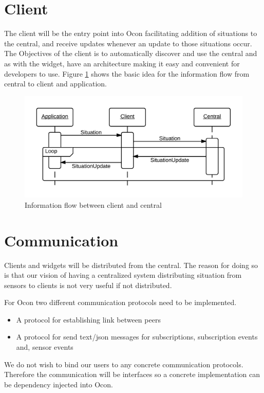 \documentclass[../report.tex]{subfiles}
\begin{document}
\section{Client}

The client will be the entry point into Ocon facilitating addition of situations to the central, and receive updates whenever an update to those situations occur. The Objectives of the client is to automatically discover and use the central and as with the widget, have an architecture making it easy and convenient for developers to use. Figure \ref{seqclient} shows the basic idea for the information flow from central to client and application.


\begin{figure}[H]
\centering
\includegraphics[scale=0.2]{clientsequencediagram.png}
\caption{Information flow between client and central}
\label{seqclient}
\end{figure}


\section{Communication}

Clients and widgets will be distributed from the central. The reason for doing so is that our vision of having a centralized system distributing situation from sensors to clients is not very useful if not distributed.

For Ocon two different communication protocols need to be implemented.\\

\begin{itemize}
    \item A protocol for establishing link between peers
    \item A protocol for send text/json messages for subscriptions, subscription events and, sensor events \\
\end{itemize}

We do not wish to bind our users to any concrete communication protocols. Therefore the communication will be interfaces so a concrete implementation can be dependency injected into Ocon.
\end{document}
